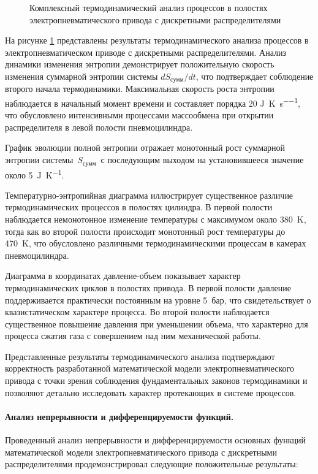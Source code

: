 \begin{figure}[ht]
    \caption{Комплексный термодинамический анализ процессов в полостях электропневматического привода с дискретными распределителями}
    \label{fig:ch2/thermodynamics_analysis}

\end{figure}

На рисунке \ref{fig:ch2/thermodynamics_analysis} представлены результаты термодинамического анализа процессов в электропневматическом
приводе с дискретными распределителями. Анализ динамики изменения энтропии демонстрирует положительную скорость изменения суммарной 
энтропии системы $dS_{сумм}/dt$, что подтверждает соблюдение второго начала термодинамики.
Максимальная скорость роста энтропии наблюдается в начальный момент времени и составляет порядка 
20 \si{\joule\per\kelvin\per\second}, что обусловлено интенсивными процессами массообмена при открытии распределителя
в левой полости пневмоцилиндра.

График эволюции полной энтропии отражает монотонный рост суммарной энтропии системы~$S_{сумм}$~с последующим 
выходом на установившееся значение около 5~\si{\joule\per\kelvin}. 

Температурно-энтропийная диаграмма иллюстрирует существенное различие термодинамических процессов в полостях цилиндра.
В первой полости наблюдается немонотонное изменение температуры с максимумом около 380~\si{\kelvin},
тогда как во второй полости происходит монотонный рост температуры до 470~\si{\kelvin}, что обусловлено
различными термодинамическими процессам в камерах пневмоцилиндра.

Диаграмма в координатах давление-объем показывает характер термодинамических циклов в полостях привода. 
В первой полости давление поддерживается практически постоянным на уровне 5~бар, что свидетельствует о квазистатическом характере процесса.
Во второй полости наблюдается существенное повышение давления при уменьшении объема, что характерно для процесса сжатия газа с совершением над ним
механической работы.

Представленные результаты термодинамического анализа подтверждают корректность
разработанной математической модели электропневматического привода с точки зрения соблюдения 
фундаментальных законов термодинамики и позволяют детально исследовать характер протекающих в системе процессов.

\paragraph{Анализ непрерывности и дифференцируемости функций.}
Проведенный анализ непрерывности и дифференцируемости основных функций математической модели
электропневматического привода с дискретными распределителями продемонстрировал следующие положительные результаты:


